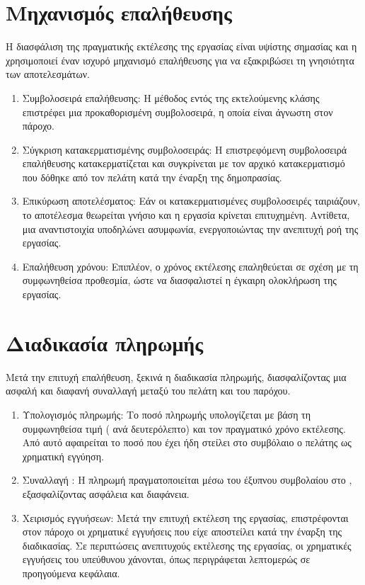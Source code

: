 \section{Μηχανισμός επαλήθευσης}
Η διασφάλιση της πραγματικής εκτέλεσης της εργασίας είναι υψίστης σημασίας και η  χρησιμοποιεί έναν ισχυρό μηχανισμό επαλήθευσης για να εξακριβώσει τη γνησιότητα των αποτελεσμάτων.

\begin{enumerate}
    \item Συμβολοσειρά επαλήθευσης: Η μέθοδος \textit{} εντός της εκτελούμενης κλάσης  επιστρέφει μια προκαθορισμένη συμβολοσειρά, η οποία είναι άγνωστη στον πάροχο.
    \item Σύγκριση κατακερματισμένης συμβολοσειράς: Η επιστρεφόμενη συμβολοσειρά επαλήθευσης κατακερματίζεται και συγκρίνεται με τον αρχικό κατακερματισμό που δόθηκε από τον πελάτη κατά την έναρξη της δημοπρασίας.
    \item Επικύρωση αποτελέσματος: Εάν οι κατακερματισμένες συμβολοσειρές ταιριάζουν, το αποτέλεσμα θεωρείται γνήσιο και η εργασία κρίνεται επιτυχημένη.
    Αντίθετα, μια αναντιστοιχία υποδηλώνει ασυμφωνία, ενεργοποιώντας την ανεπιτυχή ροή της εργασίας.
    \item Επαλήθευση χρόνου: Επιπλέον, ο χρόνος εκτέλεσης επαληθεύεται σε σχέση με τη συμφωνηθείσα προθεσμία, ώστε να διασφαλιστεί η έγκαιρη ολοκλήρωση της εργασίας.
\end{enumerate}

\section{Διαδικασία πληρωμής}
Μετά την επιτυχή επαλήθευση, ξεκινά η διαδικασία πληρωμής, διασφαλίζοντας μια ασφαλή και διαφανή συναλλαγή μεταξύ του πελάτη και του παρόχου.

\begin{enumerate}
    \item Υπολογισμός πληρωμής: Το ποσό πληρωμής υπολογίζεται με βάση τη συμφωνηθείσα τιμή ( ανά δευτερόλεπτο) και τον πραγματικό χρόνο εκτέλεσης. Από αυτό αφαιρείται το ποσό που έχει ήδη στείλει στο συμβόλαιο ο πελάτης ως χρηματική εγγύηση.
    \item Συναλλαγή : Η πληρωμή πραγματοποιείται μέσω του έξυπνου συμβολαίου  στο , εξασφαλίζοντας ασφάλεια και διαφάνεια.
    \item Χειρισμός εγγυήσεων: Μετά την επιτυχή εκτέλεση της εργασίας, επιστρέφονται στον πάροχο οι χρηματικέ εγγυήσεις που είχε αποστείλει κατά την έναρξη της διαδικασίας. Σε περιπτώσεις ανεπιτυχούς εκτέλεσης της εργασίας, οι χρηματικές εγγυήσεις του υπεύθυνου χάνονται, όπως περιγράφεται λεπτομερώς σε προηγούμενα κεφάλαια.
\end{enumerate}

